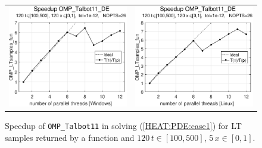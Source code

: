 \documentclass[a4paper,10pt]{report}%
\begin{document}
\begin{figure}[htb]
\centering
\begin{tabular}{cc} %
\includegraphics[height=0.2\textwidth]{./FIGS/EX3b/EX3b_fun_speedup_11_Windows.eps} &
\includegraphics[height=0.2\textwidth]{./FIGS/EX3b/EX3b_fun_speedup_11_Linux.eps}
\end{tabular}
\caption{\small Speedup of {\tt OMP\_Talbot11} in solving (\ref{HEAT:PDE:case1}) for LT samples returned
by a function and $120\,t\in[100,500]$, $5\,x\in[0,1]$.}
\label{PAR_EX3b_speedup_fun}
\end{figure}
\end{document}
